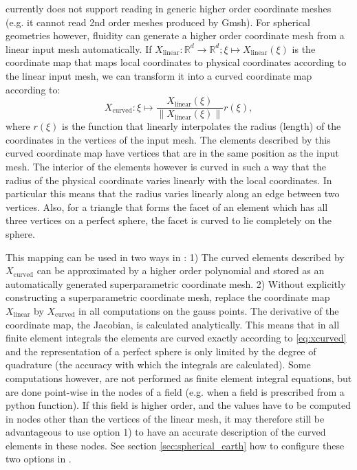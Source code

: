 \fluidity currently does not support reading in generic higher order coordinate
meshes (e.g. it cannot read 2nd order meshes produced by Gmsh). For spherical
geometries however, fluidity can generate a higher order coordinate mesh from
a linear input mesh automatically. If
$X_{\text{linear}}:\mathbb{R}^d\to\mathbb{R}^d; \xi\mapsto
X_{\text{linear}}(\xi)$ is the coordinate map that maps local coordinates to
physical coordinates according to the linear input mesh, we can transform it
into a curved coordinate map according to:
\begin{equation}
  X_{\text{curved}}: \xi\mapsto
    \frac{X_{\text{linear}}(\xi)}{\|X_{\text{linear}}(\xi)\|} r(\xi),
    \label{eq:xcurved}
\end{equation}
where $r(\xi)$ is the function that linearly interpolates the radius (length) of
the coordinates in the vertices of the input mesh. The elements described by
this curved coordinate map have vertices that are in the same position as the
input mesh. The interior of the elements however is curved in such a way that
the radius of the physical coordinate varies linearly with the local
coordinates. In particular this means that the radius varies linearly along an
edge between two vertices. Also, for a triangle that forms the facet of an
element which has all three vertices on a perfect sphere, the facet is curved to
lie completely on the sphere.

This mapping can be used in two ways in \fluidity: 1) The curved elements
described by $X_{\text{curved}}$ can be approximated by a higher order
polynomial and stored as an automatically generated superparametric
coordinate mesh. 2) Without explicitly constructing a superparametric coordinate
mesh,
replace the coordinate map $X_{\text{linear}}$ by $X_{\text{curved}}$ in all
computations on the gauss points. The derivative of the coordinate map, the
Jacobian, is calculated analytically. This means that in all finite element
integrals the elements are curved exactly according to \eqref{eq:xcurved} and
the representation of a perfect sphere is only limited by the degree of
quadrature (the accuracy with which the integrals are calculated). Some
computations however, are not performed as finite element integral equations,
but are done point-wise in the nodes of a field (e.g. when a field is
prescribed from a python function). If this field is higher order, and the
values have to be computed in nodes other than the vertices of the linear mesh,
it may therefore still be advantageous to use option 1) to have an accurate
description of the curved elements in these nodes. See section
\ref{sec:spherical_earth} how to configure these two options in \fluidity.

